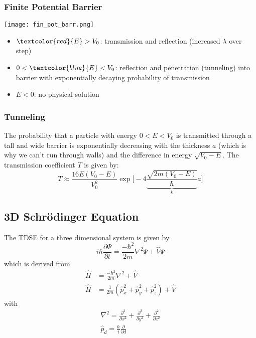 \subsubsection{Finite Potential Barrier}
\begin{center}
    \texttt{[image: fin\_pot\_barr.png]}
\end{center}
\begin{itemize}
    \item $\textcolor{red}{E}>V_0$: transmission and reflection (increased $\lambda$ over step)
    \item $0<\textcolor{blue}{E}<V_0$: reflection and penetration (tunneling) into barrier with exponentially decaying probability of transmission
    \item $E<0$: no physical solution
\end{itemize}

\subsubsection{Tunneling}
The probability that a particle with energy $0<E<V_0$ is transmitted through a tall and wide barrier is exponentially decreasing with the thickness $a$ (which is why we can't run through walls) and the difference in energy $\sqrt{V_0-E}$. The transmission coefficient $T$ is given by:
\noindent\begin{equation*}
    T\approx\frac{16E(V_0-E)}{V_0^2}\exp\Biggl[-4 \underbrace{\frac{\sqrt{2m(V_0-E)}}{\hbar}}_{k} a\Biggr]
\end{equation*}

\subsection{3D Schrödinger Equation}
The TDSE for a three dimensional system is given by
\begin{equation*}
    i\hbar\frac{\partial\Psi}{\partial t} = \frac{-\hbar^2}{2m}\nabla^2\Psi + \widehat{V}\Psi
\end{equation*}
which is derived from
\begin{align*}
    \widehat{H} & = \frac{-\hbar^2}{2m}\nabla^2 + \widehat{V}                                                  \\
    \widehat{H} & = \frac{1}{2m}\left(\widehat{p}_x^2 + \widehat{p}_y^2 +\widehat{p}_z^2 \right) + \widehat{V}
\end{align*}
with
\begin{gather*}
    \nabla^2=\frac{\partial^2}{\partial x^2}+\frac{\partial^2}{\partial y^2}+\frac{\partial^2}{\partial z^2} \\
    \widehat{p}_d = \frac{\hbar}{i}\frac{\partial}{\partial d}
\end{gather*}

